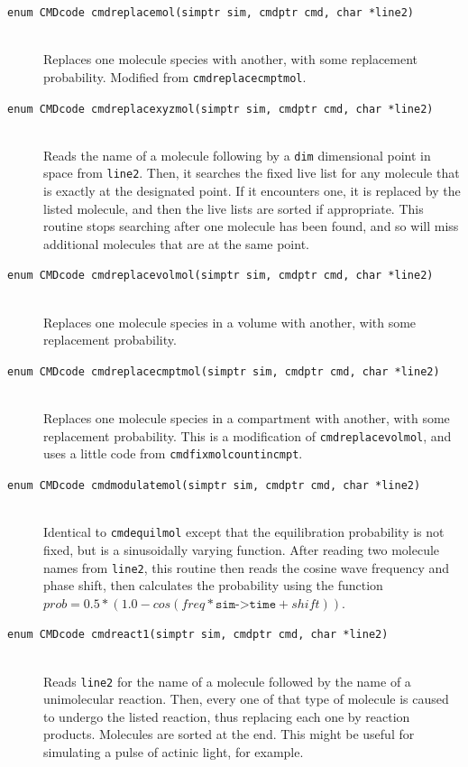 \documentclass {scrbook}
\newcommand {\ttt} {\texttt}
\begin{document}
\begin{description}
\item[\ttt{enum CMDcode cmdreplacemol(simptr sim, cmdptr cmd, char *line2)}]
\hfill \\
Replaces one molecule species with another, with some replacement probability. Modified from \ttt{cmdreplacecmptmol}.

\item[\ttt{enum CMDcode cmdreplacexyzmol(simptr sim, cmdptr cmd, char *line2)}]
\hfill \\
Reads the name of a molecule following by a \ttt{dim} dimensional point in space from \ttt{line2}. Then, it searches the fixed live list for any molecule that is exactly at the designated point. If it encounters one, it is replaced by the listed molecule, and then the live lists are sorted if appropriate. This routine stops searching after one molecule has been found, and so will miss additional molecules that are at the same point.

\item[\ttt{enum CMDcode cmdreplacevolmol(simptr sim, cmdptr cmd, char *line2)}]
\hfill \\
Replaces one molecule species in a volume with another, with some replacement probability.

\item[\ttt{enum CMDcode cmdreplacecmptmol(simptr sim, cmdptr cmd, char *line2)}]
\hfill \\
Replaces one molecule species in a compartment with another, with some replacement probability. This is a modification of \ttt{cmdreplacevolmol}, and uses a little code from \ttt{cmdfixmolcountincmpt}.

\item[\ttt{enum CMDcode cmdmodulatemol(simptr sim, cmdptr cmd, char *line2)}]
\hfill \\
Identical to \ttt{cmdequilmol} except that the equilibration probability is not fixed, but is a sinusoidally varying function. After reading two molecule names from \ttt{line2}, this routine then reads the cosine wave frequency and phase shift, then calculates the probability using the function $prob=0.5*(1.0-cos(freq*\ttt{sim->time}+shift))$.

\item[\ttt{enum CMDcode cmdreact1(simptr sim, cmdptr cmd, char *line2)}]
\hfill \\
Reads \ttt{line2} for the name of a molecule followed by the name of a unimolecular reaction. Then, every one of that type of molecule is caused to undergo the listed reaction, thus replacing each one by reaction products. Molecules are sorted at the end. This might be useful for simulating a pulse of actinic light, for example.


\end{description}
\end{document}
